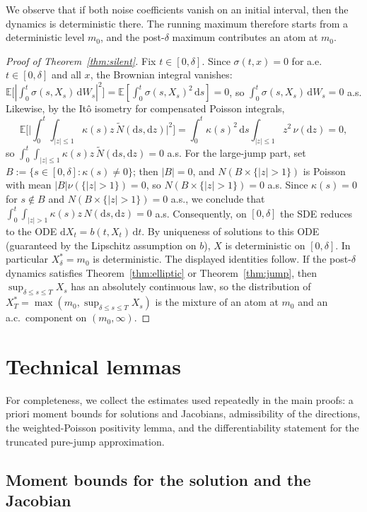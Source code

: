 \documentclass[11pt]{article}
\newcommand{\E}{\mathbb{E}}
\newcommand{\1}{\mathbf{1}}
\newcommand{\dd}{\mathrm{d}}
\newcommand{\dt}{\,\dd t}
\newcommand{\Xstar}{X^{\ast}}
\theoremstyle{plain}
\theoremstyle{definition}
\theoremstyle{remark}
\begin{document}
We observe that if both noise coefficients vanish on an initial interval, then the dynamics is deterministic there.
The running maximum therefore starts from a deterministic level $m_0$, and the post-$\delta$ maximum contributes an atom at $m_0$.


\begin{proof}[Proof of Theorem~\ref{thm:silent}]
Fix $t\in[0,\delta]$.
Since $\sigma(t,x)=0$ for a.e.\ $t\in[0,\delta]$ and all $x$, the Brownian integral vanishes:
$\E\big[|\int_0^t \sigma(s,X_s)\,\dd W_s|^2\big]=\E[\int_0^t \sigma(s,X_s)^2\,\dd s]=0$, so $\int_0^t \sigma(s,X_s)\,\dd W_s=0$ a.s.
Likewise, by the It\^o isometry for compensated Poisson integrals,
\[
\E\Big[\Big|\int_0^t\!\!\int_{|z|\le 1}\kappa(s)z\,\tilde N(\dd s,\dd z)\Big|^2\Big]
=\int_0^t \kappa(s)^2\,\dd s\int_{|z|\le 1} z^2\,\nu(\dd z)=0,
\]
so $\int_0^t\int_{|z|\le 1}\kappa(s)z\,\tilde N(\dd s,\dd z)=0$ a.s.
For the large-jump part, set $B:=\{s\in[0,\delta]:\kappa(s)\neq 0\}$; then $|B|=0$, and $N(B\times\{|z|>1\})$ is Poisson with mean $|B|\nu(\{|z|>1\})=0$, so $N(B\times\{|z|>1\})=0$ a.s.
Since $\kappa(s)=0$ for $s\notin B$ and $N(B\times\{|z|>1\})=0$ a.s., we conclude that
$\int_0^t\int_{|z|>1}\kappa(s)z\,N(\dd s,\dd z)=0$ a.s.
Consequently, on $[0,\delta]$ the SDE reduces to the ODE $\dd X_t=b(t,X_t)\dt$.
By uniqueness of solutions to this ODE (guaranteed by the Lipschitz assumption on $b$), $X$ is deterministic on $[0,\delta]$.
In particular $\Xstar_\delta=m_0$ is deterministic.
The displayed identities follow.
If the post-$\delta$ dynamics satisfies Theorem~\ref{thm:elliptic} or Theorem~\ref{thm:jump},
then $\sup_{\delta\le s\le T}X_s$ has an absolutely continuous law, so the distribution of $\Xstar_T=\max(m_0,\sup_{\delta\le s\le T}X_s)$
is the mixture of an atom at $m_0$ and an a.c.\ component on $(m_0,\infty)$.
\end{proof}

\appendix
\section{Technical lemmas}\label{sec:appendix}

For completeness, we collect the estimates used repeatedly in the main proofs:
a priori moment bounds for solutions and Jacobians, admissibility of the directions, the weighted-Poisson positivity lemma,
and the differentiability statement for the truncated pure-jump approximation.

\subsection{Moment bounds for the solution and the Jacobian}
\end{document}
